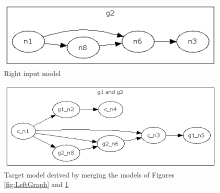 \begin{figure}[hb]
	\centering
		\includegraphics{images/RightGraph.png}
	\caption{Right input model}
	\label{fig:RightGraph}
\end{figure}


\begin{figure}[hb]
	\centering
		\includegraphics{images/MergedGraph.png}
	\caption{Target model derived by merging the models of Figures \ref{fig:LeftGraph} and \ref{fig:RightGraph}}
	\label{fig:TargetGraph}
\end{figure}